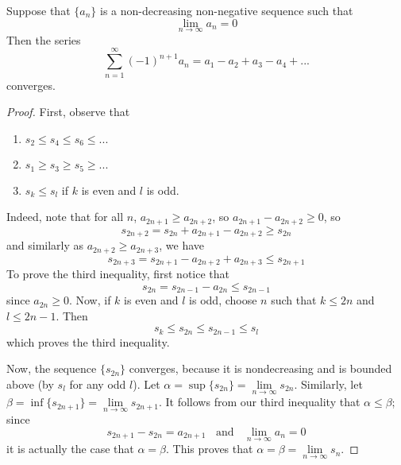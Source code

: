 \begin{namthm}\label{thmname:alttest}
    Suppose that $\{a_n\}$ is a non-decreasing non-negative sequence such that \begin{equation*}
        \lim\limits_{n\rightarrow \infty} a_n = 0
    \end{equation*}
    Then the series \begin{equation*}
        \sum\limits_{n=1}^{\infty}(-1)^{n+1}a_n = a_1-a_2+a_3-a_4+...
    \end{equation*}
    converges.
\end{namthm}
\begin{proof}
    First, observe that \begin{enumerate}
        \item $s_2 \leq s_4 \leq s_6 \leq ...$
        \item $s_1 \geq s_3 \geq s_5 \geq ...$ 
        \item $s_k\leq s_l$ if $k$ is even and $l$ is odd.
    \end{enumerate}
    Indeed, note that for all $n$, $a_{2n+1} \geq a_{2n+2}$, so $a_{2n+1} - a_{2n+2} \geq 0$, so \begin{equation*}
        s_{2n+2} = s_{2n} + a_{2n+1} - a_{2n+2} \geq s_{2n}
    \end{equation*}
    and similarly as $a_{2n+2} \geq a_{2n+3}$, we have \begin{equation*}
        s_{2n+3} = s_{2n+1} -a_{2n+2}+a_{2n+3} \leq s_{2n+1}
    \end{equation*}
    To prove the third inequality, first notice that \begin{equation*}
        s_{2n} = s_{2n-1} - a_{2n} \leq s_{2n-1}
    \end{equation*}
    since $a_{2n} \geq 0$. Now, if $k$ is even and $l$ is odd, choose $n$ such that $k\leq 2n$ and $l \leq 2n-1$. Then \begin{equation*}
        s_k \leq s_{2n} \leq s_{2n-1} \leq s_l
    \end{equation*}
    which proves the third inequality.

    Now, the sequence $\{s_{2n}\}$ converges, because it is nondecreasing and is bounded above (by $s_l$ for any odd $l$). Let $\alpha = \sup\{s_{2n}\} = \lim\limits_{n\rightarrow\infty} s_{2n}$. Similarly, let $\beta = \inf\{s_{2n+1}\} = \lim\limits_{n\rightarrow \infty}s_{2n+1}$. It follows from our third inequality that $\alpha \leq \beta$; since \begin{equation*}
        s_{2n+1}-s_{2n} = a_{2n+1}\;\;\text{ and }\;\;\lim\limits_{n\rightarrow \infty}a_n = 0
    \end{equation*}
    it is actually the case that $\alpha = \beta$. This proves that $\alpha = \beta = \lim\limits_{n\rightarrow \infty} s_n$.
\end{proof}


